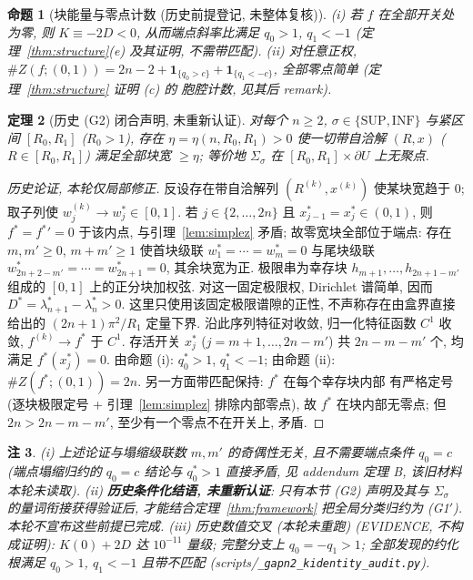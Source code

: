 \documentclass[UTF8]{ctexart}
\newtheorem{theorem}{定理}[section]
\newtheorem{proposition}[theorem]{命题}
\newtheorem{remark}[theorem]{注}
\begin{document}
\begin{proposition}[块能量与零点计数 (历史前提登记, 未整体复核)]
(i) 若 $f$ 在全部开关处为零, 则 $K\equiv-2D<0$, 从而端点斜率比满足
$q_0>1$, $q_1<-1$ (定理~\ref{thm:structure}(e) 及其证明, 不需带匹配).
(ii) 对任意正权, $\#Z(f;(0,1))=2n-2+\mathbf1_{\{q_0>c\}}
+\mathbf1_{\{q_1<-c\}}$, 全部零点简单 (定理~\ref{thm:structure} 证明 (c) 的
胞腔计数, 见其后 remark).
\end{proposition}

\begin{theorem}[历史 (G2) 闭合声明, 未重新认证]\label{thm:g2}
对每个 $n\ge2$, $\sigma\in\{\mathrm{SUP},\mathrm{INF}\}$ 与紧区间
$[R_0,R_1]$ ($R_0>1$), 存在 $\eta=\eta(n,R_0,R_1)>0$ 使一切带自洽解
$(R,x)$ ($R\in[R_0,R_1]$) 满足全部块宽 $\ge\eta$; 等价地 $\Sigma_\sigma$
在 $[R_0,R_1]\times\partial U$ 上无聚点.
\end{theorem}

\begin{proof}[历史论证, 本轮仅局部修正]
反设存在带自洽解列 $(R^{(k)},x^{(k)})$ 使某块宽趋于 $0$; 取子列使
$w_j^{(k)}\to w_j^*\in[0,1]$. 若 $j\in\{2,\dots,2n\}$ 且
$x_{j-1}^*=x_j^*\in(0,1)$, 则 $f^*=f^{*}{}'=0$ 于该内点, 与引理~\ref{lem:simplez}
矛盾; 故零宽块全部位于端点: 存在 $m,m'\ge0$, $m+m'\ge1$ 使首块级联
$w_1^*=\cdots=w_m^*=0$ 与尾块级联 $w_{2n+2-m'}^*=\cdots=w_{2n+1}^*=0$,
其余块宽为正. 极限串为幸存块 $h_{m+1},\dots,h_{2n+1-m'}$ 组成的
$[0,1]$ 上的正分块加权弦. 对这一固定极限权, Dirichlet 谱简单, 因而
$D^*=\lambda_{n+1}^*-\lambda_n^*>0$. 这里只使用该固定极限谱隙的正性,
不声称存在由盒界直接给出的 $(2n+1)\pi^2/R_1$ 定量下界.
沿此序列特征对收敛, 归一化特征函数 $C^1$ 收敛,
$f^{(k)}\to f^*$ 于 $C^1$. 存活开关 $x_j^*$ ($j=m+1,\dots,2n-m'$) 共
$2n-m-m'$ 个, 均满足 $f^*(x_j^*)=0$. 由命题 (i): $q_0^*>1$, $q_1^*<-1$;
由命题 (ii): $\#Z(f^*;(0,1))=2n$. 另一方面带匹配保持: $f^*$ 在每个幸存块内部
有严格定号 (逐块极限定号 + 引理~\ref{lem:simplez} 排除内部零点), 故
$f^*$ 在块内部无零点; 但 $2n>2n-m-m'$, 至少有一个零点不在开关上, 矛盾.
\end{proof}

\begin{remark}
(i) 上述论证与塌缩级联数 $m,m'$ 的奇偶性无关, 且不需要端点条件
$q_0=c$ (端点塌缩归约的 $q_0=c$ 结论与 $q_0^*>1$ 直接矛盾, 见 addendum
定理 B, 该旧材料本轮未读取).
(ii) \textbf{历史条件化结语, 未重新认证}: 只有本节 (G2) 声明及其与
$\Sigma_\sigma$ 的量词衔接获得验证后, 才能结合定理~\ref{thm:framework}
把全局分类归约为 (G1$'$). 本轮不宣布这些前提已完成.
(iii) 历史数值交叉 (本轮未重跑)
(EVIDENCE, 不构成证明): $K(0)+2D$ 达 $10^{-11}$ 量级; 完整分支上
$q_0=-q_1>1$; 全部发现的约化根满足 $q_0>1$, $q_1<-1$ 且带不匹配
(scripts/\texttt{\_gapn2\_kidentity\_audit.py}).
\end{remark}
\end{document}
